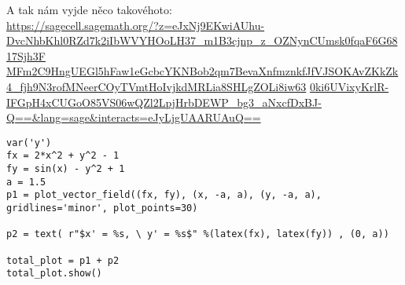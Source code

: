 \documentclass[12pt]{article}					%
\begin{document}
\begin{priklad}
\begin{reseni}
		A tak nám vyjde něco takovéhoto:\\
		\tiny
		\href{https://sagecell.sagemath.org/?z=eJxNj9EKwiAUhu-DvcNhbKhl0RZd7k2iIbWVYHOoLH37_m1B3cjnp_z_OZNynCUmsk0fqaF6G6817Sjh3FMFm2C9HngUEGl5hFaw1eGcbcYKNBob2qm7BevaXnfmznkfJfVJSOKAvZKkZk4_fjh9N3rofMNeerCOyTVmtHoIvjkdMRLia8SHLgZOLi8iw630ki6UVixyKrlR-IFGpH4xCUGoO85VS06wQZl2LpjHrbDEWP_bg3_aNxcfDxBJ-Q==&lang=sage&interacts=eJyLjgUAARUAuQ==}{https://sagecell.sagemath.org/?z=eJxNj9EKwiAUhu-DvcNhbKhl0RZd7k2iIbWVYHOoLH37\_m1B3cjnp\_z\_OZNynCUmsk0fqaF6G6817Sjh3F}
		\href{https://sagecell.sagemath.org/?z=eJxNj9EKwiAUhu-DvcNhbKhl0RZd7k2iIbWVYHOoLH37_m1B3cjnp_z_OZNynCUmsk0fqaF6G6817Sjh3FMFm2C9HngUEGl5hFaw1eGcbcYKNBob2qm7BevaXnfmznkfJfVJSOKAvZKkZk4_fjh9N3rofMNeerCOyTVmtHoIvjkdMRLia8SHLgZOLi8iw630ki6UVixyKrlR-IFGpH4xCUGoO85VS06wQZl2LpjHrbDEWP_bg3_aNxcfDxBJ-Q==&lang=sage&interacts=eJyLjgUAARUAuQ==}{MFm2C9HngUEGl5hFaw1eGcbcYKNBob2qm7BevaXnfmznkfJfVJSOKAvZKkZk4\_fjh9N3rofMNeerCOyTVmtHoIvjkdMRLia8SHLgZOLi8iw63}
		\href{https://sagecell.sagemath.org/?z=eJxNj9EKwiAUhu-DvcNhbKhl0RZd7k2iIbWVYHOoLH37_m1B3cjnp_z_OZNynCUmsk0fqaF6G6817Sjh3FMFm2C9HngUEGl5hFaw1eGcbcYKNBob2qm7BevaXnfmznkfJfVJSOKAvZKkZk4_fjh9N3rofMNeerCOyTVmtHoIvjkdMRLia8SHLgZOLi8iw630ki6UVixyKrlR-IFGpH4xCUGoO85VS06wQZl2LpjHrbDEWP_bg3_aNxcfDxBJ-Q==&lang=sage&interacts=eJyLjgUAARUAuQ==}{0ki6UVixyKrlR-IFGpH4xCUGoO85VS06wQZl2LpjHrbDEWP\_bg3\_aNxcfDxBJ-Q==\&lang=sage\&interacts=eJyLjgUAARUAuQ==}
\begin{verbatim}
var('y')
fx = 2*x^2 + y^2 - 1
fy = sin(x) - y^2 + 1
a = 1.5
p1 = plot_vector_field((fx, fy), (x, -a, a), (y, -a, a), gridlines='minor', plot_points=30)

p2 = text( r"$x' = %s, \ y' = %s$" %(latex(fx), latex(fy)) , (0, a))

total_plot = p1 + p2
total_plot.show()
\end{verbatim}
	\end{reseni}
\end{priklad}
\end{document}
